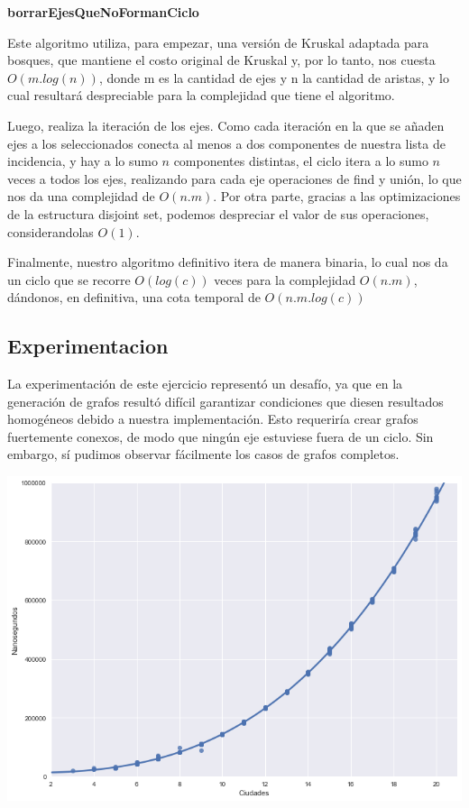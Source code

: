 \begin{center}
\textbf{borrarEjesQueNoFormanCiclo}
\end{center}
Este algoritmo utiliza, para empezar, una versión de Kruskal adaptada para bosques, que mantiene el costo original de Kruskal y, por lo tanto, nos cuesta $O(m.log(n))$, donde m es la cantidad de ejes y n la cantidad de aristas, y lo cual resultará despreciable para la complejidad que tiene el algoritmo.
\\
\par
Luego, realiza la iteración de los ejes. Como cada iteración en la que se añaden ejes a los seleccionados conecta al menos a dos componentes de nuestra lista de incidencia, y hay a lo sumo $n$ componentes distintas, el ciclo itera a lo sumo $n$ veces a todos los ejes, realizando para cada eje operaciones de find y unión, lo que nos da una complejidad de $O(n.m)$. Por otra parte, gracias a las optimizaciones de la estructura disjoint set, podemos despreciar el valor de sus operaciones, considerandolas $O(1)$.
\\
\par
Finalmente, nuestro algoritmo definitivo itera de manera binaria, lo cual nos da un ciclo que se recorre $O(log(c))$ veces para la complejidad $O(n.m)$, dándonos, en definitiva, una cota temporal de $O(n.m.log(c))$

\subsection{Experimentacion}

La experimentación de este ejercicio representó un desafío, ya que en la generación de grafos resultó difícil garantizar condiciones que diesen resultados homogéneos debido a nuestra implementación. Esto requeriría crear grafos fuertemente conexos, de modo que ningún eje estuviese fuera de un ciclo. Sin embargo, sí pudimos observar fácilmente los casos de grafos completos.

\begin{center}
	\includegraphics[scale=0.5]{imagenes/ej2-1.png}
\end{center}

